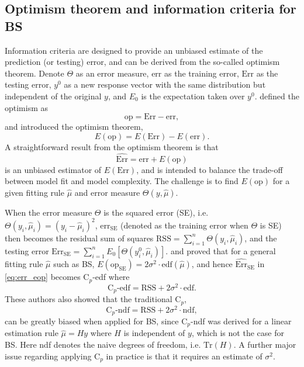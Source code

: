 \subsection{Optimism theorem and information criteria for BS}
\label{sec:optimism}
Information criteria are designed to provide an unbiased estimate of the prediction (or testing) error, and can be derived from the so-called optimism theorem. Denote $\Theta$ as an error measure, $\text{err}$ as the training error, $\text{Err}$ as the testing error, $y^0$ as a new response vector with the same distribution but independent of the original $y$, and $E_0$ is the expectation taken over $y^0$. \citet{Efron1986} defined the optimism as 
\begin{equation*}
\text{op} = \text{Err} - \text{err},
\end{equation*}
and introduced the optimism theorem,
\begin{equation*}
E(\text{op}) = E(\text{Err}) - E(\text{err}).
\end{equation*}
A straightforward result from the optimism theorem is that 
\begin{equation}
\widehat{\text{Err}} = \text{err} + E(\text{op})
\label{eq:err_eop}
\end{equation}
is an unbiased estimator of $E(\text{Err})$, and is intended to balance the trade-off between model fit and model complexity. The challenge is to find $E(\text{op})$ for a given fitting rule $\hat{\mu}$ and error measure $\Theta(y,\hat{\mu})$.

When the error measure $\Theta$ is the squared error (SE), i.e. $\Theta(y_i,\hat{\mu}_i)=(y_i-\hat{\mu}_i)^2$, $\text{err}_{\text{SE}}$ (denoted as the training error when $\Theta$ is SE) then becomes the residual sum of squares $\text{RSS} = \sum_{i=1}^{n} \Theta(y_i, \hat{\mu}_i)$, and the testing error $\text{Err}_\text{SE} =\sum_{i=1}^n E_0[\Theta(y^0_i,\hat{\mu}_i)]$. \citet{Ye1998} and \citet{Efron2004} proved that for a general fitting rule $\hat{\mu}$ such as BS, $E(\text{op}_{\text{SE}})=2\sigma^2 \cdot \text{edf}(\hat{\mu})$, and hence $\widehat{\text{Err}}_{\text{SE}}$ in \eqref{eq:err_eop} becomes C$_p$-edf where 
\begin{equation}
\text{C}_p\text{-edf} = \text{RSS} + 2 \sigma^2 \cdot \text{edf}.
\label{eq:cp_edf}
\end{equation}
These authors also showed that the traditional C$_p$,
\begin{equation*}
\text{C}_p\text{-ndf} = \text{RSS} + 2 \sigma^2 \cdot \text{ndf},
\end{equation*}
can be greatly biased when applied for BS, since C$_p$-ndf \citep{mallows1973some} was derived for a linear estimation rule $\hat{\mu} = Hy$ where $H$ is independent of $y$, which is not the case for BS. Here ndf denotes the naive degrees of freedom, i.e. $\text{Tr}(H)$. A further major issue regarding applying C$_p$ in practice is that it requires an estimate of $\sigma^2$. 

